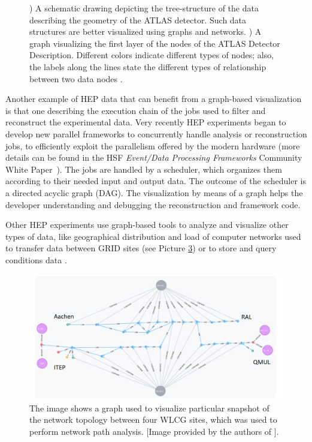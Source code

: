 \documentclass[12pt,a4paper]{article}
\begin{document}
\begin{figure}
\begin{subfigure}[b]{0.6\textwidth}
		\caption[A graph visualizing the ATLAS geometry data]{}
		\label{fig:atlasgeo2}
	\end{subfigure}
	\caption[Using 3D editing software for HEP Geometry]
	{\small {}) A schematic drawing depicting the tree-structure of the data describing the geometry of the ATLAS detector. Such data structures are better visualized using graphs and networks. ) A graph visualizing the first layer of the nodes of the ATLAS Detector Description. Different colors indicate different types of nodes; also, the labels along the lines state the different types of relationship between two data nodes \cite{ATLASGeoModel2017}.}
	\label{fig:atlasgeotree}
\end{figure}



Another example of HEP data that can benefit from a graph-based visualization is that one describing the execution chain of the jobs
used to filter and reconstruct the experimental data. Very recently HEP experiments began to develop new parallel frameworks
to concurrently handle analysis or reconstruction jobs, to efficiently exploit the parallelism offered by the modern hardware
(more details can be found in the HSF \textit{Event/Data Processing Frameworks} Community White Paper~\cite{HSF-CWP-2017-08}).
The jobs are handled by a scheduler, which organizes them according to their needed input and output data. The outcome of the scheduler
is a directed acyclic graph (DAG). The visualization by means of a graph helps the developer understanding and debugging the
reconstruction and framework code.

Other HEP experiments use graph-based tools to analyze and visualize other types of data, like geographical distribution and load of computer
networks used to transfer data between GRID sites \cite{neo4jnetworkstudy} (see Picture \ref{fig:networkstudy})
 or to store and query conditions data \cite{Clemencic:2012cw}.

\begin{figure}
	\centering
	\includegraphics[width=0.95\linewidth]{proximity.png}
	\caption[Graphs used to visualize network topologies]
	{\small The image shows a graph used to visualize particular snapshot of the network topology between four WLCG sites, which was used to perform network path analysis. [Image provided by the authors of \cite{neo4jnetworkstudy}].}
	\label{fig:networkstudy}
\end{figure}
\end{document}
